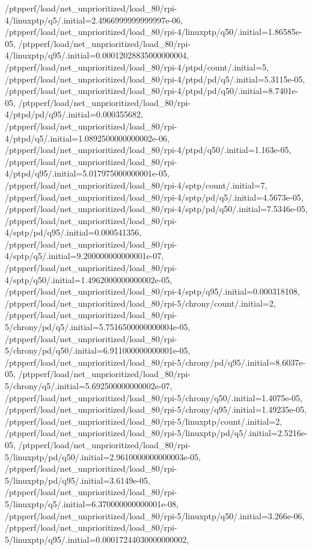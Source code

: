 {    /ptpperf/load/net_unprioritized/load_80/rpi-4/linuxptp/q5/.initial=2.4966999999999997e-06,
    /ptpperf/load/net_unprioritized/load_80/rpi-4/linuxptp/q50/.initial=1.86585e-05,
    /ptpperf/load/net_unprioritized/load_80/rpi-4/linuxptp/q95/.initial=0.00012028835000000004,
    /ptpperf/load/net_unprioritized/load_80/rpi-4/ptpd/count/.initial=5,
    /ptpperf/load/net_unprioritized/load_80/rpi-4/ptpd/pd/q5/.initial=5.3115e-05,
    /ptpperf/load/net_unprioritized/load_80/rpi-4/ptpd/pd/q50/.initial=8.7401e-05,
    /ptpperf/load/net_unprioritized/load_80/rpi-4/ptpd/pd/q95/.initial=0.000355682,
    /ptpperf/load/net_unprioritized/load_80/rpi-4/ptpd/q5/.initial=1.0892500000000002e-06,
    /ptpperf/load/net_unprioritized/load_80/rpi-4/ptpd/q50/.initial=1.163e-05,
    /ptpperf/load/net_unprioritized/load_80/rpi-4/ptpd/q95/.initial=5.017975000000001e-05,
    /ptpperf/load/net_unprioritized/load_80/rpi-4/sptp/count/.initial=7,
    /ptpperf/load/net_unprioritized/load_80/rpi-4/sptp/pd/q5/.initial=4.5673e-05,
    /ptpperf/load/net_unprioritized/load_80/rpi-4/sptp/pd/q50/.initial=7.5346e-05,
    /ptpperf/load/net_unprioritized/load_80/rpi-4/sptp/pd/q95/.initial=0.000541356,
    /ptpperf/load/net_unprioritized/load_80/rpi-4/sptp/q5/.initial=9.200000000000001e-07,
    /ptpperf/load/net_unprioritized/load_80/rpi-4/sptp/q50/.initial=1.4962000000000002e-05,
    /ptpperf/load/net_unprioritized/load_80/rpi-4/sptp/q95/.initial=0.000318108,
    /ptpperf/load/net_unprioritized/load_80/rpi-5/chrony/count/.initial=2,
    /ptpperf/load/net_unprioritized/load_80/rpi-5/chrony/pd/q5/.initial=5.7516500000000004e-05,
    /ptpperf/load/net_unprioritized/load_80/rpi-5/chrony/pd/q50/.initial=6.911000000000001e-05,
    /ptpperf/load/net_unprioritized/load_80/rpi-5/chrony/pd/q95/.initial=8.6037e-05,
    /ptpperf/load/net_unprioritized/load_80/rpi-5/chrony/q5/.initial=5.692500000000002e-07,
    /ptpperf/load/net_unprioritized/load_80/rpi-5/chrony/q50/.initial=1.4075e-05,
    /ptpperf/load/net_unprioritized/load_80/rpi-5/chrony/q95/.initial=1.49235e-05,
    /ptpperf/load/net_unprioritized/load_80/rpi-5/linuxptp/count/.initial=2,
    /ptpperf/load/net_unprioritized/load_80/rpi-5/linuxptp/pd/q5/.initial=2.5216e-05,
    /ptpperf/load/net_unprioritized/load_80/rpi-5/linuxptp/pd/q50/.initial=2.9610000000000003e-05,
    /ptpperf/load/net_unprioritized/load_80/rpi-5/linuxptp/pd/q95/.initial=3.6149e-05,
    /ptpperf/load/net_unprioritized/load_80/rpi-5/linuxptp/q5/.initial=6.370000000000001e-08,
    /ptpperf/load/net_unprioritized/load_80/rpi-5/linuxptp/q50/.initial=3.266e-06,
    /ptpperf/load/net_unprioritized/load_80/rpi-5/linuxptp/q95/.initial=0.00017244030000000002,
}

